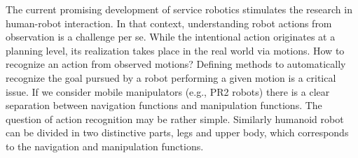 \documentclass[letterpaper, 10pt, conference]{ieeeconf}      %
\begin{document}
The current promising development of service robotics stimulates the
research in human-robot interaction. In that context, understanding
robot actions from observation is a challenge per se. While the
intentional action originates at a planning level, its realization takes
place in the real world via motions. How to recognize an action from
observed motions? Defining methods to automatically recognize the goal
pursued by a robot performing a given motion is a critical issue. If we
consider mobile manipulators (e.g., PR2 robots)
there is a clear separation between navigation functions and
manipulation functions. The question of action recognition may be rather
simple. Similarly humanoid robot can be divided in two distinctive parts,
legs and upper body, which corresponds to the navigation and manipulation
functions.
\end{document}
